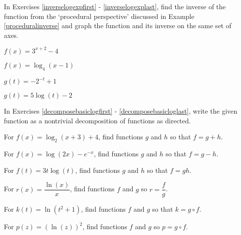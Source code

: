 \documentclass{ximera}
\begin{document}
\begin{question}
In Exercises \ref{inverselogexpfirst} - \ref{inverselogexplast},  find the inverse of the function from the `procedural perspective' discussed in Example \ref{proceduralinverse} and graph the function and its inverse on the same set of axes.

\begin{problem}\label{inverselogexpfirst}
$f(x) = 3^{x + 2} - 4$
\end{problem}

\begin{problem}
$f(x) = \log_{4}(x - 1)$
\end{problem}

\begin{problem}
$g(t)= -2^{-t} + 1$
\end{problem}

\begin{problem}\label{inverselogexplast}
$g(t) = 5\log(t) - 2$ 
\end{problem}

\end{question}
\begin{question}
In Exercises \ref{decomposebasiclogfirst} - \ref{decomposebasicloglast}, write the given function as a nontrivial decomposition of functions as directed.

\begin{problem}\label{decomposebasiclogfirst}
For $f(x) = \log_{2}(x+3) + 4$, find functions $g$ and $h$ so that $f=g+h$. 
\end{problem}

\begin{problem}
For $f(x) = \log(2x) - e^{-x}$, find functions $g$ and $h$ so that $f=g-h$. 
\end{problem}

\begin{problem}
For $f(t) = 3t \log(t)$, find functions $g$ and $h$ so that $f=gh$.
\end{problem}

\begin{problem}
For $r(x) = \dfrac{\ln(x)}{x}$, find functions $f$ and $g$ so $r = \dfrac{f}{g}$.
\end{problem}

\begin{problem}
For $k(t) = \ln(t^2+1)$, find functions $f$ and $g$  so that $k = g \circ f$.
\end{problem}

\begin{problem}\label{decomposebasicloglast}
For $p(z) = (\ln(z))^2$, find functions $f$ and $g$ so $p = g \circ f$. 
\end{problem}
\end{question}
\end{document}
